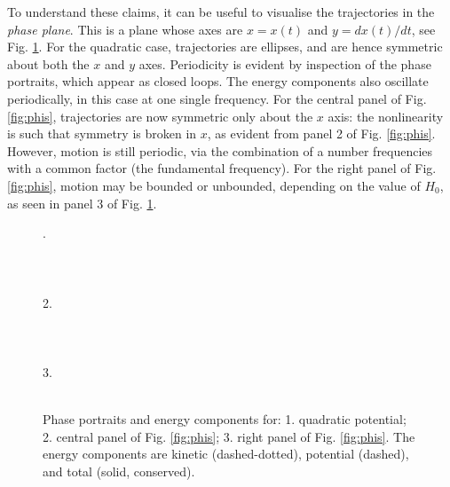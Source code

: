 \documentclass[11pt,twoside,a4paper,english]{book}
\begin{document}
To understand these claims, it can be useful to visualise the trajectories in the \emph{phase plane}. This is a plane whose axes are $x = x(t)$ and $y = dx(t)/dt$, see Fig. \ref{fig:phasePorts}. For the quadratic case, trajectories are ellipses, and are hence symmetric about both the $x$ and $y$ axes. Periodicity is evident by inspection of the phase portraits, which appear as closed loops. The energy components also oscillate periodically, in this case at one single frequency. 
For the central panel of Fig. \ref{fig:phis}, trajectories are now symmetric only about the $x$ axis: the nonlinearity is such that symmetry is broken in $x$, as evident from panel 2 of Fig. \ref{fig:phis}. However, motion is still periodic, via the combination of a number frequencies with a common factor (the fundamental frequency). For the right panel of Fig. \ref{fig:phis}, motion may be  bounded or unbounded, depending on the value of $H_0$, as seen in panel 3 of  Fig. \ref{fig:phasePorts}. 
\begin{figure}
    .\\ ~\\  \\~\\
    2.\\~\\  \\~\\
    3.\\ ~\\
    \caption{Phase portraits and energy components for: 1. quadratic potential; 2. central panel of Fig. \ref{fig:phis}; 3. right panel of Fig. \ref{fig:phis}. The energy components are kinetic (dashed-dotted), potential (dashed), and total (solid, conserved).}\label{fig:phasePorts}
\end{figure}
\end{document}
